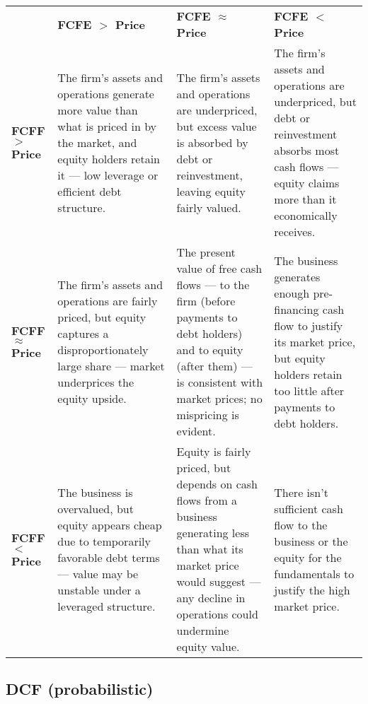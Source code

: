 \noindent
\begin{tabular}{>{\raggedright\arraybackslash}p{}
                >{\raggedright\arraybackslash}p{}
                >{\raggedright\arraybackslash}p{}
                >{\raggedright\arraybackslash}p{}}

\textbf{} 
& \textbf{FCFE $>$ Price} 
& \textbf{FCFE $\approx$ Price} 
& \textbf{FCFE $<$ Price} \\

\textbf{FCFF $>$ Price}
& \signalstrongbuy{} The firm's assets and operations generate more value than what is priced in by the market, and equity holders retain it — low leverage or efficient debt structure.
& \signalbuy{} The firm's assets and operations are underpriced, but excess value is absorbed by debt or reinvestment, leaving equity fairly valued.
& \signalcaution{} The firm's assets and operations are underpriced, but debt or reinvestment absorbs most cash flows — equity claims more than it economically receives. \\

\textbf{FCFF $\approx$ Price}
& \signalbuy{} The firm's assets and operations are fairly priced, but equity captures a disproportionately large share — market underprices the equity upside.
& \signalhold{} The present value of free cash flows — to the firm (before payments to debt holders) and to equity (after them) — is consistent with market prices; no mispricing is evident.
& \signalspeculative{} The business generates enough pre-financing cash flow to justify its market price, but equity holders retain too little after payments to debt holders. \\

\textbf{FCFF $<$ Price}
& \signalcaution{} The business is overvalued, but equity appears cheap due to temporarily favorable debt terms — value may be unstable under a leveraged structure.
& \signalspeculative{} Equity is fairly priced, but depends on cash flows from a business generating less than what its market price would suggest — any decline in operations could undermine equity value.
& \signalavoid{} There isn't sufficient cash flow to the business or the equity for the fundamentals to justify the high market price. \\
\end{tabular}


\newpage\subsection{DCF (probabilistic)}

